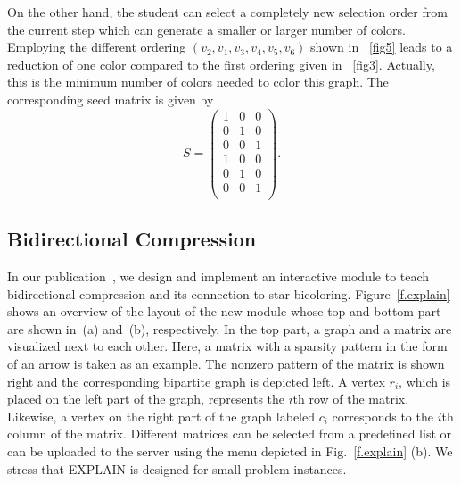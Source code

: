 \documentclass[11pt, twoside,a4paper]{book}
\begin{document}
On the other hand, the student can select a completely new selection order from the current step which can generate a smaller or larger number of colors. Employing the different ordering $(v_2,v_1,v_3,v_4,v_5,v_6)$ shown in \figurename~\ref{fig5} leads to a reduction of one color compared to the first ordering given in \figurename~\ref{fig3}. Actually, this is the minimum number of colors needed to color this graph. The corresponding seed matrix is given by
$$
S =
\begin{pmatrix}
1 & 0 & 0 \\
0 & 1 & 0 \\
0 & 0 & 1 \\
1 & 0 & 0 \\
0 & 1 & 0 \\
0 & 0 & 1 \\
\end{pmatrix}.
$$
\subsection{Bidirectional Compression}
\label{s.bidirectional}
In our publication~\cite{2014:09}, we design and implement an interactive module to
teach bidirectional compression and its connection to star bicoloring.
Figure~\ref{f.explain} shows an overview of the layout of the new module whose top and
bottom part are shown in~(a) and~(b), respectively. In the top part, a graph and a matrix
are visualized next to each other. Here, a matrix with a sparsity pattern in the form of
an arrow is taken as an example. The nonzero pattern of the matrix is shown right and the
corresponding bipartite graph is depicted left. A vertex $r_i$, which is placed on the
left part of the graph, represents the $i$th row of the matrix. Likewise, a vertex on the
right part of the graph labeled $c_i$ corresponds to the $i$th column of the matrix.
Different matrices can be selected from a predefined list or can be uploaded to the
server using the menu depicted in Fig.~\ref{f.explain} (b). We stress that EXPLAIN is
designed for small problem instances.
\end{document}
